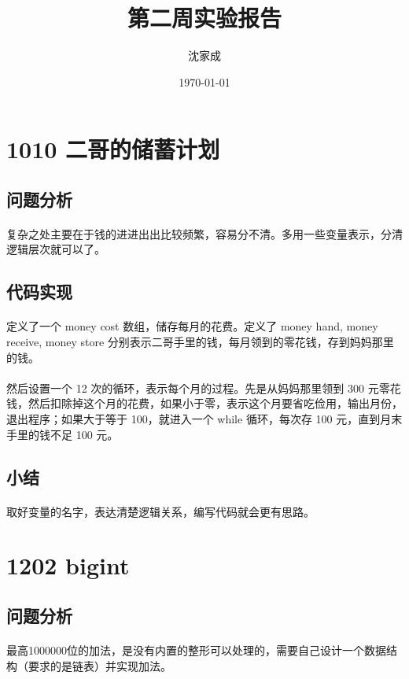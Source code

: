 \documentclass[UTF-8, 12pt]{ctexart}
\title{第二周实验报告}
\author{沈家成}
\date{\today}
\begin{document}
\maketitle
\section{1010 二哥的储蓄计划}
    \subsection{问题分析}
    \paragraph{}
    复杂之处主要在于钱的进进出出比较频繁，容易分不清。多用一些变量表示，分清逻辑层次就可以了。
    \subsection{代码实现}
    \paragraph{}
    定义了一个 money cost 数组，储存每月的花费。定义了 money hand, money receive, money store 分别表示二哥手里的钱，每月领到的零花钱，存到妈妈那里的钱。
    \paragraph{}
    然后设置一个 12 次的循环，表示每个月的过程。先是从妈妈那里领到 300 元零花钱，然后扣除掉这个月的花费，如果小于零，表示这个月要省吃俭用，输出月份，退出程序；如果大于等于 100，就进入一个 while 循环，每次存 100 元，直到月末手里的钱不足 100 元。
    \subsection{小结}
    \paragraph{}
    取好变量的名字，表达清楚逻辑关系，编写代码就会更有思路。

\section{1202 bigint}
    \subsection{问题分析}
    \paragraph{}
    最高1000000位的加法，是没有内置的整形可以处理的，需要自己设计一个数据结构（要求的是链表）并实现加法。
\end{document}
